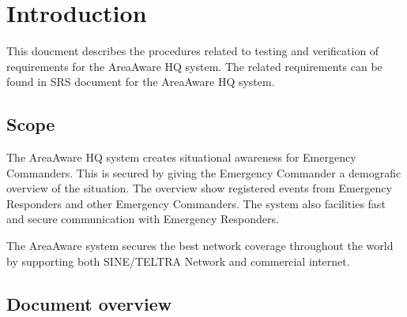 \label{chp_introduction}
\chapter{Introduction}
This doucment describes the procedures related to testing and verification of requirements for the AreaAware HQ system. The related requirements can be found in SRS document for the AreaAware HQ system.

\section{Scope}

The AreaAware HQ system creates situational awareness for Emergency Commanders. This is secured by giving the Emergency Commander a demografic overview of the situation. The overview show registered events from Emergency Responders and other Emergency Commanders. The system also facilities fast and secure communication with Emergency Responders.

The AreaAware system secures the best network coverage throughout the world by supporting both SINE/TELTRA Network and commercial internet.


\section{Document overview}
